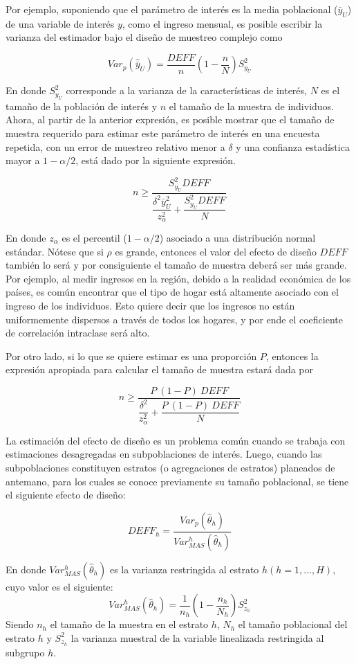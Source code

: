 \documentclass[12pt,spanish,]{book}
\begin{document}
Por ejemplo, suponiendo que el parámetro de interés es la media poblacional (\(\bar{y}_U\)) de una variable de interés \(y\), como el ingreso mensual, es posible escribir la varianza del estimador bajo el diseño de muestreo complejo como

\[
Var_p(\hat{\bar{y}}_U) = \frac{DEFF}{n}\left(1-\frac{n}{N}\right)S^2_{y_U}
\]

En donde \(S^2_{y_U}\) corresponde a la varianza de la características de interés, \(N\) es el tamaño de la población de interés y \(n\) el tamaño de la muestra de individuos. Ahora, al partir de la anterior expresión, es posible mostrar que el tamaño de muestra requerido para estimar este parámetro de interés en una encuesta repetida, con un error de muestreo relativo menor a \(\delta\) y una confianza estadística mayor a \(1-\alpha/2\), está dado por la siguiente expresión.

\[ 
n \geq \dfrac{S^2_{y_U}DEFF}{\dfrac{\delta^2 \bar{y}_U^2}{z_{\alpha}^2}+\dfrac{S^2_{y_U}DEFF}{N}}
\]

En donde \(z_{\alpha}\) es el percentil (\(1- \alpha/2\)) asociado a una distribución normal estándar. Nótese que si \(\rho\) es grande, entonces el valor del efecto de diseño \(DEFF\) también lo será y por consiguiente el tamaño de muestra deberá ser más grande. Por ejemplo, al medir ingresos en la región, debido a la realidad económica de los países, es común encontrar que el tipo de hogar está altamente asociado con el ingreso de los individuos. Esto quiere decir que los ingresos no están uniformemente dispersos a través de todos los hogares, y por ende el coeficiente de correlación intraclase será alto.

Por otro lado, si lo que se quiere estimar es una proporción \(P\), entonces la expresión apropiada para calcular el tamaño de muestra estará dada por

\[ 
n \geq \dfrac{P\ (1-P)\ DEFF}{\dfrac{\delta^2}{z_{\alpha}^2 }+\dfrac{P\ (1-P) \ DEFF}{N}}
\]

La estimación del efecto de diseño es un problema común cuando se trabaja con estimaciones desagregadas en subpoblaciones de interés. Luego, cuando las subpoblaciones constituyen estratos (o agregaciones de estratos) planeados de antemano, para los cuales se conoce previamente su tamaño poblacional, se tiene el siguiente efecto de diseño:

\[
DEFF_h= \frac{Var_p (\hat\theta_h) }{Var_{MAS}^h(\hat\theta_h) }
\]

En donde \(Var_{MAS}^h(\hat\theta_h)\) es la varianza restringida al estrato \(h (h=1,\ldots, H)\), cuyo valor es el siguiente:
\[
Var_{MAS}^h(\hat\theta_h)=\frac{1}{n_h}\left(1-\frac{n_h}{N_h}\right)S_{z_h}^2
\]
Siendo \(n_h\) el tamaño de la muestra en el estrato \(h\), \(N_h\) el tamaño poblacional del estrato \(h\) y \(S_{z_h}^2\) la varianza muestral de la variable linealizada restringida al subgrupo \(h\).
\end{document}

